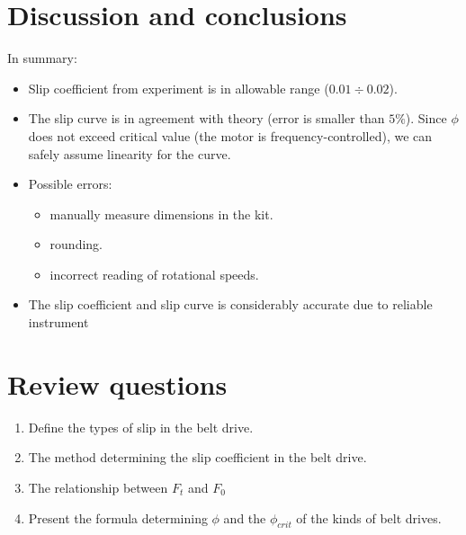 \section{Discussion and conclusions}
In summary:
\begin{itemize}
	\item Slip coefficient from experiment is in allowable range ($ 0.01\div0.02 $).
	\item The slip curve is in agreement with theory (error is smaller than $ 5\% $). Since $ \phi $ does not exceed critical value (the motor is frequency-controlled), we can safely assume linearity for the curve.
	\item Possible errors:
	\begin{itemize}
		\item manually measure dimensions in the kit.
		\item rounding.
		\item incorrect reading of rotational speeds.
	\end{itemize}
	\item The slip coefficient and slip curve is considerably accurate due to reliable instrument
\end{itemize}
\section{Review questions}
\begin{enumerate}
	\item Define the types of slip in the belt drive.
	\item The method determining the slip coefficient in the belt drive.
	\item  The relationship between $ F_t $ and $ F_0 $
	\item Present the formula determining $ \phi $ and the $ \phi_{crit} $ of the kinds of belt drives.
\end{enumerate}